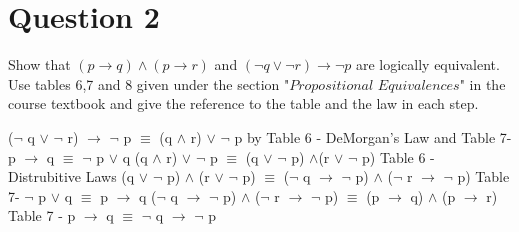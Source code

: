 \documentclass[a4paper,12pt]{article}
\newcommand\tab[1][1cm]{\hspace*{#1}}
\begin{document}
\section*{Question 2 \hfill {}}
\tab Show that $(p \rightarrow q) \wedge (p \rightarrow r)$ and $(\neg q \vee \neg r)\rightarrow \neg p$ are logically equivalent. Use tables 6,7 and 8 given under the section "$\textit{Propositional Equivalences}$" in the course textbook and give the reference to the table and the law in each step.

\begin{tcolorbox}
($\lnot$ q $\lor$ $\lnot$ r) $\rightarrow$ $\lnot$ p $\equiv$ (q $\land$ r) $\lor$ $\lnot$ p
\newline
\newline
by Table 6 - DeMorgan's Law and Table 7- p $\rightarrow$ q $\equiv$ $\lnot$ p $\lor$ q 
\newline
\newline
(q $\land$ r) $\lor$ $\lnot$ p $\equiv$ (q $\lor$ $\lnot$ p) $\land$(r $\lor$ $\lnot$ p) 
\newline
\newline
Table 6 - Distrubitive Laws
\newline
\newline
(q $\lor$ $\lnot$ p) $\land$ (r $\lor$ $\lnot$ p) $\equiv$ ($\lnot$ q $\rightarrow$ $\lnot$ p) $\land$ ($\lnot$ r $\rightarrow$ $\lnot$ p)
\newline
\newline
Table 7- $\lnot$ p $\lor$ q $\equiv$ p $\rightarrow$ q
\newline
\newline
($\lnot$ q $\rightarrow$ $\lnot$ p) $\land$ ($\lnot$ r $\rightarrow$ $\lnot$ p) $\equiv$ (p $\rightarrow$ q) $\land$ (p $\rightarrow$ r)
\newline
\newline
Table 7 - p $\rightarrow$ q $\equiv$ $\lnot$ q $\rightarrow$ $\lnot$ p

\end{tcolorbox}
\newpage
\end{document}
